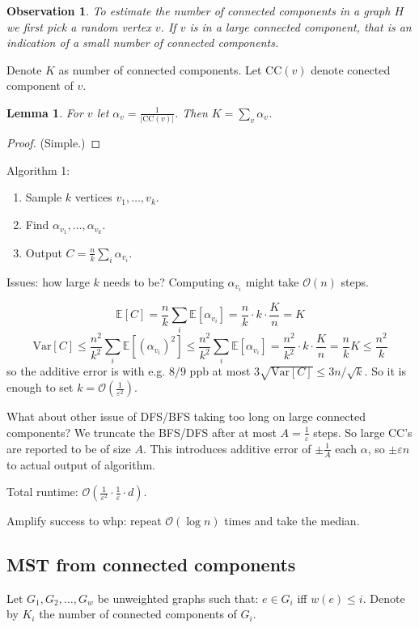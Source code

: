 \documentclass[11pt]{article}
\newtheorem{lemma}[theorem]{Lemma}
\newtheorem{observation}[theorem]{Observation}
\newcommand{\E}{{\mathbb E}}
\newcommand{\bigo}{\mathcal{O}}
\begin{document}
\begin{observation}
To estimate the number of connected components in a graph $H$ we first pick a random vertex $v$.
If $v$ is in a large connected component, that is an indication of a small number of connected components.
\end{observation}

Denote $K$ as number of connected components. Let $\text{CC}(v)$ denote conected component of $v$.

\begin{lemma}
For $v$ let $\alpha_v = \frac{1}{|\text{CC}(v)|}$. Then $K = \sum_v \alpha_v$.
\end{lemma}
\begin{proof} (Simple.)
\end{proof}

Algorithm 1:
\begin{enumerate}
\item Sample $k$ vertices $v_1,\ldots,v_k$.
\item Find $\alpha_{v_1},\ldots,\alpha_{v_k}$.
\item Output $C = \frac{n}{k} \sum_{i} \alpha_{v_i}$.
\end{enumerate}

Issues: how large $k$ needs to be? Computing $\alpha_{v_i}$ might take $\mathcal{O}(n)$ steps.

$$\E[C] = \frac{n}{k} \sum_{i} \E[\alpha_{v_i}] = \frac{n}{k} \cdot k \cdot \frac{K}{n} = K$$
$$\mathrm{Var}[C] \le \frac{n^2}{k^2} \sum_i \E[(\alpha_{v_i})^2] \le  \frac{n^2}{k^2} \sum_i \E[\alpha_{v_i}] = \frac{n^2}{k^2} \cdot k \cdot \frac{K}{n} = \frac{n}{k} K \le \frac{n^2}{k}$$
so the additive error is with e.g. $8/9$ ppb at most $3\sqrt{\mathrm{Var}[C]} \le  3n/\sqrt{k}$. So it is enough to set $k = \bigo(\frac{1}{\varepsilon^{2}})$.

What about other issue of DFS/BFS taking too long on large connected components? We truncate the BFS/DFS after at most $A = \frac{1}{\varepsilon}$ steps. So large CC's are reported to be of size $A$. This introduces additive error of $\pm \frac{1}{A}$ each $\alpha$, so $\pm \varepsilon n$ to actual output of algorithm.

Total runtime:
$\bigo(\frac{1}{\varepsilon^2} \cdot \frac{1}{\varepsilon} \cdot d)$.

Amplify success to whp: repeat $\bigo(\log n)$ times and take the median.

\subsection{MST from connected components}
Let $G_1,G_2,\ldots,G_w$ be unweighted graphs such that: $e \in G_i$ iff $w(e) \le i$. Denote by $K_i$ the number of connected components of $G_i$.
\end{document}
